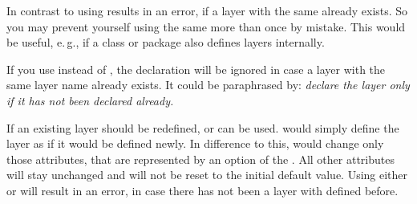 In contrast to  using  results in
an error, if a layer with the same  already exists. So you
may prevent yourself using the same  more than once by
mistake. This would be useful, e.\,g., if a class or package also defines
layers internally.

If you use  instead of , the
declaration will be ignored in case a layer with the same layer name already
exists. It could be paraphrased by: \emph{declare the layer only if it has not
  been declared already.}

If an existing layer should be redefined,  or
 can be used.  would simply define
the layer as if it would be defined newly. In difference to this,
 would change only those attributes, that are represented
by an option of the . All other attributes will stay
unchanged and will not be reset to the initial default value. Using either
 or  will result in an error, in case
there has not been a layer with  defined before.

